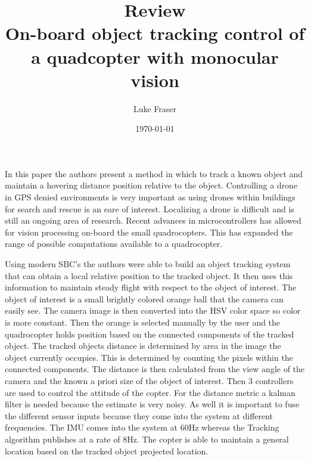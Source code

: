 \documentclass{article}
\begin{document}
\title{{\large Review} \\ On-board object tracking control of a quadcopter with monocular vision}
\author{Luke Fraser}
\date{\today}
\maketitle

\begingroup
\renewcommand{\section}[2]{}


\endgroup

\section*{Summary}
In this paper the authors present a method in which to track a known object and maintain a hovering distance position relative to the object. Controlling a drone in GPS denied environments is very important as using drones within buildings for search and rescue is an eare of interest. Localizing a drone is difficult and is still an ongoing area of research. Recent advances in microcontrollers has allowed for vision processing on-board the small quadrocopters. This has expanded the range of possible computations available to a quadrocopter.

Using modern SBC's the authors were able to build an object tracking system that can obtain a local relative position to the tracked object. It then uses this information to maintain steady flight with respect to the object of interest. The object of interest is a small brightly colored orange ball that the camera can easily see. The camera image is then converted into the HSV color space so color is more constant. Then the orange is selected manually by the user and the quadrocopter holds position based on the connected components of the tracked object. The tracked objects distance is determined by area in the image the object currently occupies. This is determined by counting the pixels within the connected components. The distance is then calculated from the view angle of the camera and the known a priori size of the object of interest. Then 3 controllers are used to control the attitude of the copter. For the distance metric a kalman filter is needed because the estimate is very noisy. As well it is important to fuse the different sensor inputs because they come into the system at different frequencies. The IMU comes into the system at 60Hz whereas the Tracking algorithm publishes at a rate of 8Hz. The copter is able to maintain a general location based on the tracked object projected location.
\end{document}
